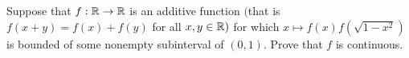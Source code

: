 Suppose that ${f: \Bbb{R} \rightarrow \Bbb{R}}$ is an additive function $($that is ${f(x+y) = f(x)+f(y)}$ for all ${x, y \in \Bbb{R}})$ for which ${x \mapsto f(x)f(\sqrt{1-x^2})}$ is bounded of some nonempty subinterval of ${(0,1)}$. Prove that ${f}$ is continuous.


